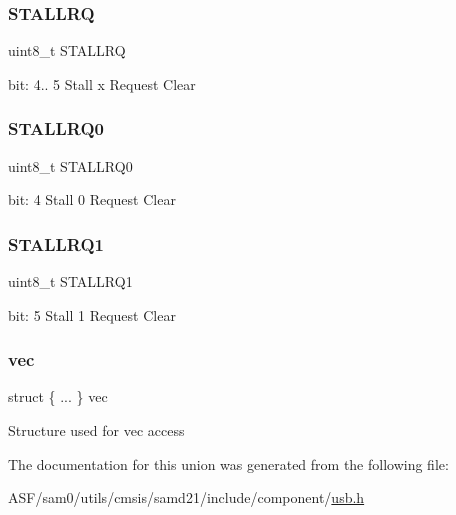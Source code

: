 \subsubsection{\texorpdfstring{STALLRQ}{STALLRQ}}
{\footnotesize\ttfamily uint8\+\_\+t S\+T\+A\+L\+L\+RQ}

bit\+: 4.. 5 Stall x Request Clear \mbox{\label{union_u_s_b___d_e_v_i_c_e___e_p_s_t_a_t_u_s_c_l_r___type_a1b62d73ab84a16453cfe76dbae8e652c}} 
\subsubsection{\texorpdfstring{STALLRQ0}{STALLRQ0}}
{\footnotesize\ttfamily uint8\+\_\+t S\+T\+A\+L\+L\+R\+Q0}

bit\+: 4 Stall 0 Request Clear \mbox{\label{union_u_s_b___d_e_v_i_c_e___e_p_s_t_a_t_u_s_c_l_r___type_aff69880ca0480a1518048272fd4b415c}} 
\subsubsection{\texorpdfstring{STALLRQ1}{STALLRQ1}}
{\footnotesize\ttfamily uint8\+\_\+t S\+T\+A\+L\+L\+R\+Q1}

bit\+: 5 Stall 1 Request Clear \mbox{\label{union_u_s_b___d_e_v_i_c_e___e_p_s_t_a_t_u_s_c_l_r___type_a26bd444ed7c4631001822f55ba068cac}} 
\subsubsection{\texorpdfstring{vec}{vec}}
{\footnotesize\ttfamily struct \{ ... \}   vec}

Structure used for vec access 

The documentation for this union was generated from the following file\+:\begin{DoxyCompactItemize}
\item 
A\+S\+F/sam0/utils/cmsis/samd21/include/component/\mbox{\hyperlink{component_2usb_8h}{usb.\+h}}\end{DoxyCompactItemize}
